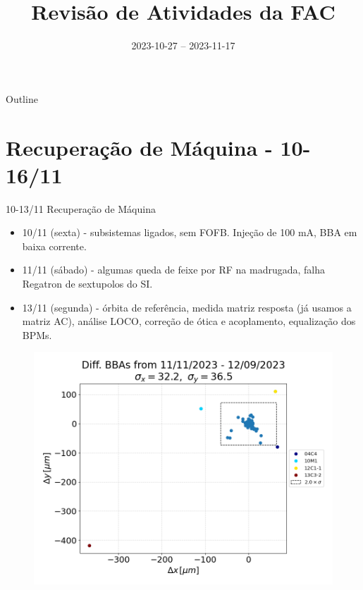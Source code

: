 \documentclass{beamer}					  %
\title{Revisão de Atividades da FAC}	%
\institute{LNLS.DAC.FAC}				%
\date{2023-10-27 -- 2023-11-17}			%
\begin{document}
\begin{frame}
  \titlepage
  \href{https://github.com/lnls-fac/doc-review-dac-fac}{}
  \href{https://www.overleaf.com/read/sbdjxtzfchrm}{}
\end{frame}

\begin{frame}{Outline}
  \tableofcontents
\end{frame}


\section{Recuperação de Máquina - 10-16/11}

\begin{frame}{10-13/11 Recuperação de Máquina}
    \begin{minipage}{0.4\textwidth}
        \scriptsize{
        \begin{itemize}
    		\item 10/11 (sexta) - subsistemas ligados, sem FOFB. Injeção de 100 mA, BBA em baixa corrente.
            \item 11/11 (sábado) - algumas queda de feixe por RF na madrugada, falha Regatron de sextupolos do SI.
            \item 13/11 (segunda) - órbita de referência, medida matriz resposta (já usamos a matriz AC), análise LOCO, correção de ótica e acoplamento, equalização dos BPMs.
        \end{itemize}}
    \end{minipage}
    \begin{minipage}{0.58\textwidth}
        \captionsetup[figure]{font=tiny}
        \begin{figure}[H]
        	\centering
            \includegraphics[width=1\textwidth]{2023-11-17/figures/diff_to_bba_after_september23_shutdown.png}

\end{figure}
\end{minipage}
\end{frame}
\end{document}
